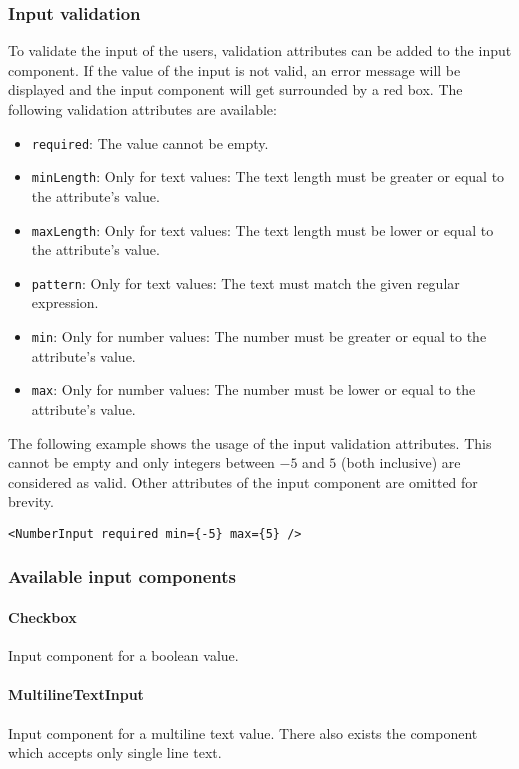 \subsubsection*{Input validation}
To validate the input of the users, validation attributes can be added to the input component. 
If the value of the input is not valid, an error message will be displayed and the input component will get surrounded by a red box. 
The following validation attributes are available:
\begin{itemize}
  \item \texttt{required}: The value cannot be empty.
  \item \texttt{minLength}: Only for text values: The text length must be greater or equal to the attribute's value.
  \item \texttt{maxLength}: Only for text values: The text length must be lower or equal to the attribute's value.
  \item \texttt{pattern}: Only for text values: The text must match the given regular expression.
  \item \texttt{min}: Only for number values: The number must be greater or equal to the attribute's value.
  \item \texttt{max}: Only for number values: The number must be lower or equal to the attribute's value.
\end{itemize}

The following example shows the usage of the input validation attributes. 
This  cannot be empty and only integers between $-5$ and $5$ (both inclusive) are considered as valid.
Other attributes of the input component are omitted for brevity.
\begin{verbatim}
<NumberInput required min={-5} max={5} />
\end{verbatim}

\subsubsection*{Available input components}
\paragraph{Checkbox}
\label{sec:component-checkbox}
Input component for a boolean value.

\paragraph{MultilineTextInput}
\label{sec:component-multiline-text-input}
Input component for a multiline text value. 
There also exists the  component which accepts only single line text.

